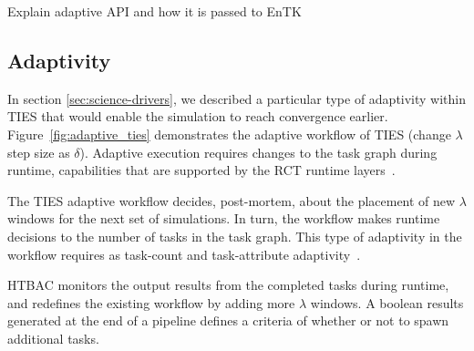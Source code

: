 Explain adaptive API and how it is passed to EnTK







\subsection{Adaptivity}

In section \ref{sec:science-drivers}, we described a particular type of
adaptivity within TIES that would enable the simulation to reach
convergence earlier. Figure~\ref{fig:adaptive_ties} demonstrates the adaptive 
workflow of TIES (change $\lambda$ step size as $\delta$). 
Adaptive execution requires changes to the task graph 
during runtime, capabilities that are supported by the RCT runtime 
layers~\cite{power-of-many17}.

The TIES adaptive workflow decides, post-mortem, about the placement
of new $\lambda$ windows for the next set of simulations. In turn, the workflow
makes runtime decisions to the number of tasks in the task graph. This type of 
adaptivity in the workflow requires as task-count and task-attribute 
adaptivity~\cite{adaptivebiomolecular}. 


HTBAC monitors the output results from the completed tasks
during runtime, and redefines the existing workflow by adding more $\lambda$
windows. A boolean results generated at the end of a pipeline defines a criteria
of whether or not to spawn additional tasks. 

